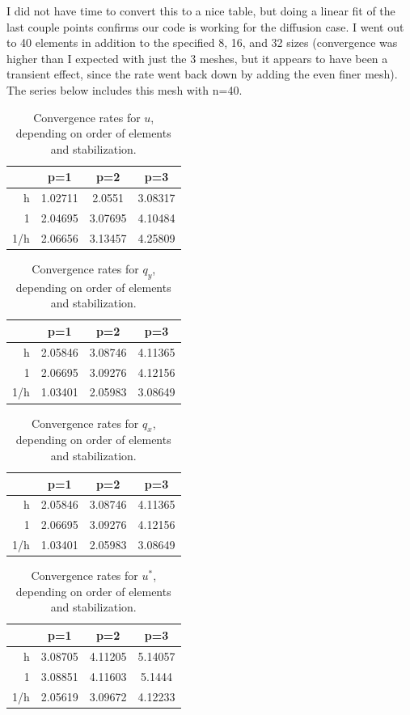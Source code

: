 \documentclass{article}
\begin{document}
I did not have time to convert this to a nice table, but doing a linear fit of the last couple points confirms our code is working for the diffusion case.
I went out to 40 elements in addition to the specified 8, 16, and 32 sizes (convergence was higher than I expected with just the 3 meshes, but it appears to have been a transient effect, since the rate went back down by adding the even finer mesh).
The series below includes this mesh with n=40.

\begin{table}[!ht]
\caption{Convergence rates for $u$, depending on order of elements and stabilization.}
\centering
\begin{tabular}{r | |c c c}
& p=1 & p=2 & p=3 \\
\midrule
h & 1.02711 & 2.0551 & 3.08317 \\
1 & 2.04695 & 3.07695 & 4.10484 \\ 
1/h & 2.06656 & 3.13457 & 4.25809
\end{tabular}
\end{table}

\begin{table}[!ht]
\caption{Convergence rates for $q_y$, depending on order of elements and stabilization.}
\centering
\begin{tabular}{r | |c c c}
& p=1 & p=2 & p=3 \\
\midrule
h & 2.05846 & 3.08746 & 4.11365 \\
1 & 2.06695 & 3.09276 & 4.12156 \\
1/h & 1.03401 & 2.05983 & 3.08649
\end{tabular}
\end{table}

\begin{table}[!ht]
\caption{Convergence rates for $q_x$, depending on order of elements and stabilization.}
\centering
\begin{tabular}{r | |c c c}
& p=1 & p=2 & p=3 \\
\midrule
h & 2.05846 & 3.08746 & 4.11365 \\
1 & 2.06695 & 3.09276 & 4.12156 \\
1/h & 1.03401 & 2.05983 & 3.08649
\end{tabular}
\end{table}

\begin{table}[!ht]
\caption{Convergence rates for $u^*$, depending on order of elements and stabilization.}
\centering
\begin{tabular}{r | |c c c}
& p=1 & p=2 & p=3 \\
\midrule
h & 3.08705 & 4.11205 & 5.14057 \\
1 & 3.08851 & 4.11603 & 5.1444 \\
1/h & 2.05619 & 3.09672 & 4.12233
\end{tabular}
\end{table}
\clearpage
\end{document}
